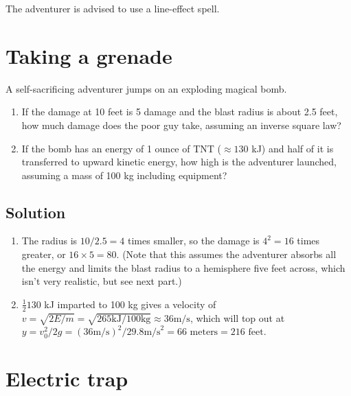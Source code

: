 \documentclass[12pt,letterpaper]{article}
\begin{document}
The adventurer is advised to use a line-effect spell.

\section{Taking a grenade}

A self-sacrificing adventurer jumps on an exploding magical bomb.

\begin{enumerate}
\item If the damage at 10 feet is 5 damage and the blast radius is about 2.5 feet, how much damage does the poor guy take, assuming an inverse square law?
\item If the bomb has an energy of 1 ounce of TNT ($\approx 130$ kJ) and half of it is transferred to upward kinetic energy, how high is the adventurer launched, assuming a mass of 100 kg including equipment?
\end{enumerate}


\subsection{Solution}


\begin{enumerate}
\item The radius is $10/2.5 = 4$ times smaller, so the damage is $4^2 = 16$ times greater, or $16 \times 5 = 80$. (Note that this assumes the adventurer absorbs all the energy and limits the blast radius to a hemisphere five feet across, which isn't very realistic, but see next part.)
\item $\frac{1}{2} 130$ kJ imparted to 100 kg gives a velocity of $v = \sqrt{2 E/m} = \sqrt{2 65 \textrm{kJ} / 100 \textrm{kg}} \approx 36 \textrm{m/s}$, which will top out at $y = v_0^2 / 2g = (36 \textrm{m/s})^2/ 2 9.8 \textrm{m/s}^2 = 66 \textrm{ meters} = 216 \textrm{ feet}$.
\end{enumerate}

\section{Electric trap}

\end{document}
